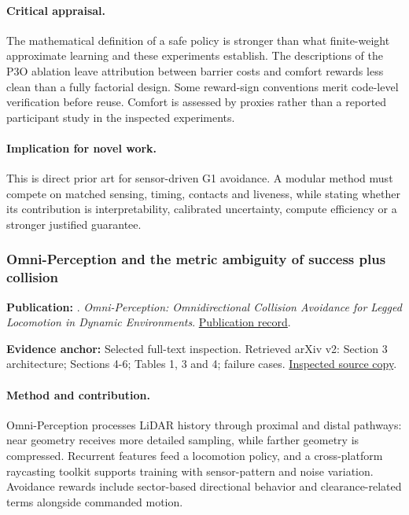 \paragraph{Critical appraisal.} The mathematical definition of a safe policy is stronger than what finite-weight approximate learning and these experiments establish. The descriptions of the P3O ablation leave attribution between barrier costs and comfort rewards less clean than a fully factorial design. Some reward-sign conventions merit code-level verification before reuse. Comfort is assessed by proxies rather than a reported participant study in the inspected experiments.

\paragraph{Implication for novel work.} This is direct prior art for sensor-driven G1 avoidance. A modular method must compete on matched sensing, timing, contacts and liveness, while stating whether its contribution is interpretability, calibrated uncertainty, compute efficiency or a stronger justified guarantee.

\subsubsection{Omni-Perception and the metric ambiguity of success plus collision}\label{paper:omni}
\textbf{Publication:} \citet{omni}. \emph{Omni-Perception: Omnidirectional Collision Avoidance for Legged Locomotion in Dynamic Environments}. \href{https://arxiv.org/abs/2505.19214}{Publication record}.

\textbf{Evidence anchor:} Selected full-text inspection. Retrieved arXiv v2: Section 3 architecture; Sections 4-6; Tables 1, 3 and 4; failure cases. \href{https://arxiv.org/pdf/2505.19214}{Inspected source copy}.

\paragraph{Method and contribution.} Omni-Perception processes LiDAR history through proximal and distal pathways: near geometry receives more detailed sampling, while farther geometry is compressed. Recurrent features feed a locomotion policy, and a cross-platform raycasting toolkit supports training with sensor-pattern and noise variation. Avoidance rewards include sector-based directional behavior and clearance-related terms alongside commanded motion.

